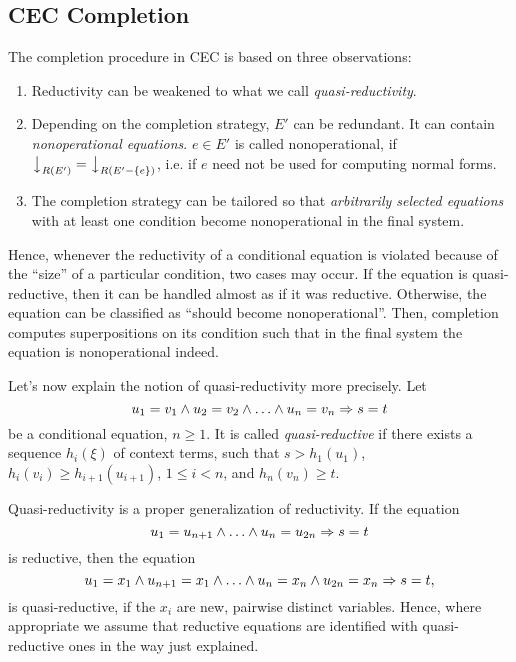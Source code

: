 \subsection{CEC Completion}
\label{Completion}

The completion procedure in CEC is based on three
observations:
\begin{enumerate}
\item
Reductivity can be weakened to what we call {\em quasi-reductivity}.
\item
Depending on the completion strategy, $E'$ can be redundant.
It can contain {\em nonoperational equations}.
$e \in E'$ is called nonoperational, if ${\big\downarrow_{R(E')}} = {\big\downarrow_{R(E'-\{e\})}}$,
i.e. if $e$ need not be used for computing normal forms.
\item
The completion strategy can be tailored so
that {\em arbitrarily selected equations} with at least one condition become
nonoperational in the final system.
\end{enumerate}
Hence, whenever the reductivity of a conditional equation is
violated because of the ``size'' of a particular condition, two cases may occur.
If the equation is quasi-reductive, then it can be handled
almost as if it was reductive. Otherwise, the equation
can be classified as ``should become nonoperational''. Then, completion
computes superpositions on its condition such that
in the final system the equation is nonoperational indeed. 

Let's now explain the notion of quasi-reductivity more precisely.
Let
$$ \condEq{\cond{\eq{u_1}{v_1}\condAnd\eq{u_2}{v_2}}
                {\eq{u_n}{v_n}}}
          {\eq{s}{t}} $$
be a conditional equation, $n\ge 1$. It is called {\em quasi-reductive}
if
there exists a sequence $h_i(\xi)$ of context terms,
such that $s>h_1(u_1)$, $h_i(v_i)\ge h_{i+1}(u_{i+1})$,
$1\le i < n$, and $h_n(v_n)\ge t$.

Quasi-reductivity is a proper generalization of reductivity.
If the equation
$$\condEq{\cond{\eq{u_1}{u_{n+1}}}
               {\eq{u_n}{u_{2n}}}}
         {\eq{s}{t}}$$ 
is reductive, then the equation
$$
\condEq{\cond{\eq{u_1}{x_1}\condAnd\eq{u_{n+1}}{x_1}}
             {\eq{u_n}{x_n}\condAnd\eq{u_{2n}}{x_n}}}
       {\eq{s}{t}},
$$
is quasi-reductive,
if the $x_i$ are new, pairwise distinct variables.
Hence, where appropriate we assume that reductive equations are
identified with quasi-reductive ones in the way just explained.

